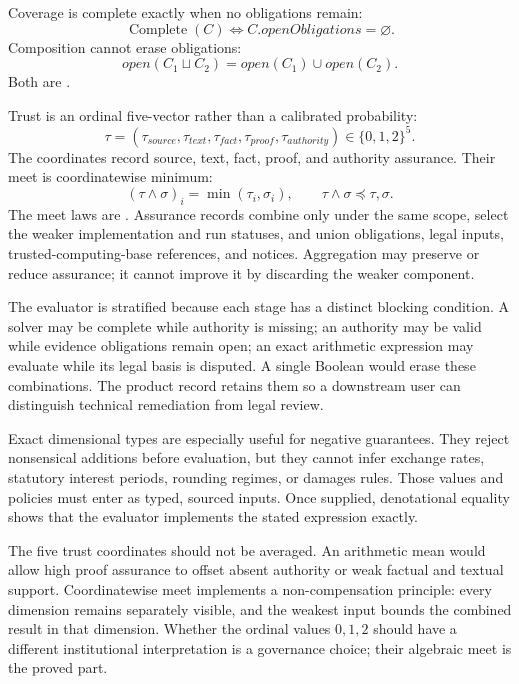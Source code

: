 Coverage is complete exactly when no obligations remain:
\begin{equation}
\operatorname{Complete}(C)\iff C.openObligations=\varnothing.
\label{eq:coverage-complete}
\end{equation}
Composition cannot erase obligations:
\begin{equation}
open(C_1\sqcup C_2)=open(C_1)\cup open(C_2).
\label{eq:coverage-union}
\end{equation}
Both are \formalized{}.

Trust is an ordinal five-vector rather than a calibrated probability:
\begin{equation}
\tau=(\tau_{source},\tau_{text},\tau_{fact},\tau_{proof},\tau_{authority})
\in\{0,1,2\}^{5}.
\label{eq:trust-vector}
\end{equation}
The coordinates record source, text, fact, proof, and authority assurance. Their meet is coordinatewise minimum:
\begin{equation}
(\tau\wedge\sigma)_i=\min(\tau_i,\sigma_i),
\qquad\tau\wedge\sigma\preceq\tau,\sigma.
\label{eq:trust-meet}
\end{equation}
The meet laws are \formalized{}. Assurance records combine only under the same scope, select the weaker implementation and run statuses, and union obligations, legal inputs, trusted-computing-base references, and notices. Aggregation may preserve or reduce assurance; it cannot improve it by discarding the weaker component.

The evaluator is stratified because each stage has a distinct blocking condition. A solver may be complete while authority is missing; an authority may be valid while evidence obligations remain open; an exact arithmetic expression may evaluate while its legal basis is disputed. A single Boolean would erase these combinations. The product record retains them so a downstream user can distinguish technical remediation from legal review.

Exact dimensional types are especially useful for negative guarantees. They reject nonsensical additions before evaluation, but they cannot infer exchange rates, statutory interest periods, rounding regimes, or damages rules. Those values and policies must enter as typed, sourced inputs. Once supplied, denotational equality shows that the evaluator implements the stated expression exactly.

The five trust coordinates should not be averaged. An arithmetic mean would allow high proof assurance to offset absent authority or weak factual and textual support. Coordinatewise meet implements a non-compensation principle: every dimension remains separately visible, and the weakest input bounds the combined result in that dimension. Whether the ordinal values $0,1,2$ should have a different institutional interpretation is a governance choice; their algebraic meet is the proved part.

